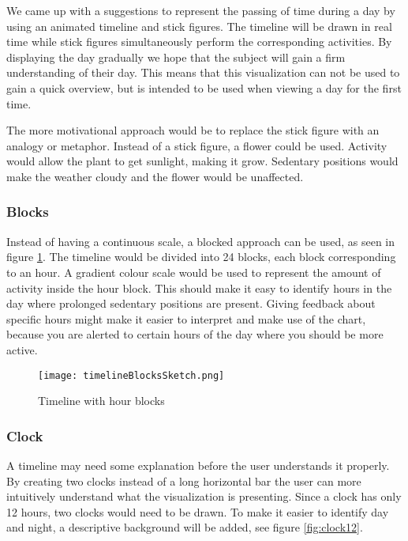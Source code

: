 We came up with a suggestions to represent the passing of time during a day by using an animated timeline and stick figures. The timeline will be drawn in real time while stick figures simultaneously perform the corresponding activities. By displaying the day gradually we hope that the subject will gain a firm understanding of their day. This means that this visualization can not be used to gain a quick overview, but is intended to be used when viewing a day for the first time.

The more motivational approach would be to replace the stick figure with an analogy or metaphor. Instead of a stick figure, a flower could be used. Activity would allow the plant to get sunlight, making it grow. Sedentary positions would make the weather cloudy and the flower would be unaffected.

\subsubsection{Blocks}
Instead of having a continuous scale, a blocked approach can be used, as seen in figure \ref{fig:timelineBlocks}. The timeline would be divided into 24 blocks, each block corresponding to an hour. A gradient colour scale would be used to represent the amount of activity inside the hour block. This should make it easy to identify hours in the day where prolonged sedentary positions are present. Giving feedback about specific hours might make it easier to interpret and make use of the chart, because you are alerted to certain hours of the day where you should be more active.

\begin{figure}[h!]
	\centering
		\texttt{[image: timelineBlocksSketch.png]}
		\caption{\footnotesize Timeline with hour blocks}
		\label{fig:timelineBlocks}
\end{figure}

\subsubsection{Clock}
A timeline may need some explanation before the user understands it properly. By creating two clocks instead of a long horizontal bar the user can more intuitively understand what the visualization is presenting. Since a clock has only 12 hours, two clocks would need to be drawn. To make it easier to identify day and night, a descriptive background will be added, see figure \ref{fig:clock12}.

